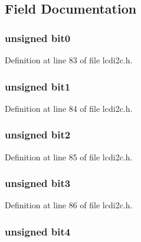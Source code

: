 \subsection{Field Documentation}
\hypertarget{union___byte___a0431bdd0457eee8f478543c2ebeed536}{
\subsubsection[{bit0}]{\setlength{\rightskip}{0pt plus 5cm}unsigned bit0}}\label{union___byte___a0431bdd0457eee8f478543c2ebeed536}


Definition at line 83 of file lcdi2c.\-h.

\hypertarget{union___byte___a3c8a699d0b9fee5bcccf99a37fb5f7b4}{
\subsubsection[{bit1}]{\setlength{\rightskip}{0pt plus 5cm}unsigned bit1}}\label{union___byte___a3c8a699d0b9fee5bcccf99a37fb5f7b4}


Definition at line 84 of file lcdi2c.\-h.

\hypertarget{union___byte___a047292ded0521ee6eccf3b553d53f46e}{
\subsubsection[{bit2}]{\setlength{\rightskip}{0pt plus 5cm}unsigned bit2}}\label{union___byte___a047292ded0521ee6eccf3b553d53f46e}


Definition at line 85 of file lcdi2c.\-h.

\hypertarget{union___byte___ad8e1e9f4aeee9f8766d9c0b5297093bb}{
\subsubsection[{bit3}]{\setlength{\rightskip}{0pt plus 5cm}unsigned bit3}}\label{union___byte___ad8e1e9f4aeee9f8766d9c0b5297093bb}


Definition at line 86 of file lcdi2c.\-h.

\hypertarget{union___byte___a8236c7b2559b977adbaf5255d2111814}{
\subsubsection[{bit4}]{\setlength{\rightskip}{0pt plus 5cm}unsigned bit4}}\label{union___byte___a8236c7b2559b977adbaf5255d2111814}


